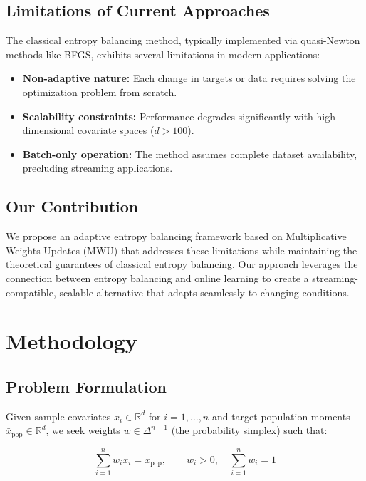 \documentclass[12pt, letterpaper]{article}
\begin{document}
\subsection{Limitations of Current Approaches}

The classical entropy balancing method, typically implemented via quasi-Newton methods like BFGS, exhibits several limitations in modern applications:

\begin{itemize}
\item \textbf{Non-adaptive nature:} Each change in targets or data requires solving the optimization problem from scratch.
\item \textbf{Scalability constraints:} Performance degrades significantly with high-dimensional covariate spaces ($d > 100$).
\item \textbf{Batch-only operation:} The method assumes complete dataset availability, precluding streaming applications.
\end{itemize}

\subsection{Our Contribution}

We propose an adaptive entropy balancing framework based on Multiplicative Weights Updates (MWU) that addresses these limitations while maintaining the theoretical guarantees of classical entropy balancing. Our approach leverages the connection between entropy balancing and online learning to create a streaming-compatible, scalable alternative that adapts seamlessly to changing conditions.

\section{Methodology}

\subsection{Problem Formulation}

Given sample covariates $x_i \in \mathbb{R}^d$ for $i = 1,\ldots,n$ and target population moments $\bar{x}_{\text{pop}} \in \mathbb{R}^d$, we seek weights $w \in \Delta^{n-1}$ (the probability simplex) such that:

\begin{equation}
\sum_{i=1}^{n} w_i x_i = \bar{x}_{\text{pop}}, \qquad w_i > 0, \quad \sum_{i=1}^{n} w_i = 1
\label{eq:moment_constraints}
\end{equation}
\end{document}
